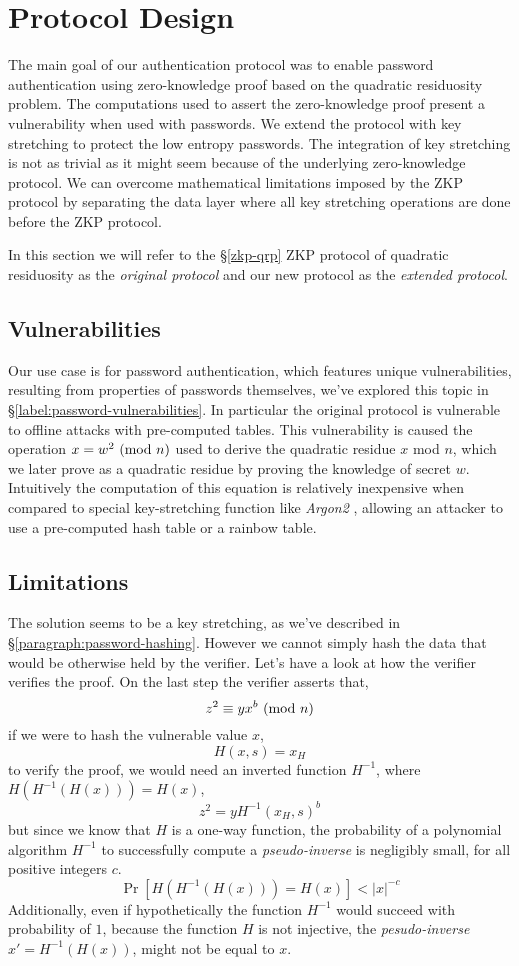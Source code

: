 \section{Protocol Design}
\label{label:protocol-design}
The main goal of our authentication protocol was to enable password authentication using zero-knowledge proof based on the quadratic residuosity problem. 
The computations used to assert the zero-knowledge proof present a vulnerability when used with passwords.
We extend the protocol with key stretching to protect the low entropy passwords.
The integration of key stretching is not as trivial as it might seem because of the underlying zero-knowledge protocol. 
We can overcome mathematical limitations imposed by the ZKP protocol by separating the data layer where all key stretching operations are done before the ZKP protocol.

In this section we will refer to the \S\ref{zkp-qrp} ZKP protocol of quadratic residuosity as the \textit{original protocol}  and our new protocol as the \textit{extended protocol}.

\subsection{Vulnerabilities}
Our use case is for password authentication, which features unique vulnerabilities, resulting from properties of passwords themselves, we've explored this topic in \S \ref{label:password-vulnerabilities}.
In particular the original protocol is vulnerable to offline attacks with pre-computed tables.
This vulnerability is caused the operation $x = w^2 \ (\mathrm{mod}\ n)$ used to derive the quadratic residue $x$ mod $n$, which we later prove as a quadratic residue by proving the knowledge of secret $w$.
Intuitively the computation of this equation is relatively inexpensive when compared to special key-stretching function like \textit{Argon2} \cite{biryukov2016argon2}, allowing an attacker to use a pre-computed hash table or a rainbow table.

\newpage
\subsection{Limitations}
The solution seems to be a key stretching, as we've described in \S\ref{paragraph:password-hashing}.
However we cannot simply hash the data that would be otherwise held by the verifier. 
Let's have a look at how the verifier verifies the proof.
On the last step the verifier asserts that,
$$ z^2 \equiv yx^b \ (\mathrm{mod}\ n)$$
if we were to hash the vulnerable value $x$,
$$H(x, s) = x_H$$
to verify the proof, we would need an inverted function $H^{-1}$, where $H(H^{-1}(H(x))) = H(x)$,
$$z^2 = yH^{-1}(x_H, s)^b$$
but since we know that $H$ is a one-way function, the probability of a polynomial algorithm $H^{-1}$ to successfully compute a \textit{pseudo-inverse} is negligibly small, for all positive integers $c$.
$$\Pr[H(H^{-1}(H(x))) = H(x)] < |x|^{-c}$$
Additionally, even if hypothetically the function $H^{-1}$ would succeed with probability of $1$, because the function $H$ is not injective, the \textit{pesudo-inverse} $x' = H^{-1}(H(x))$, might not be equal to $x$.


